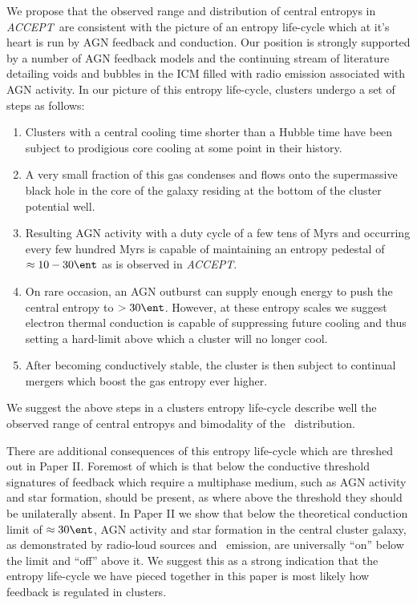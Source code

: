 \documentclass[12pt, preprint]{aastex}
\newcommand{\accept}{\textit{ACCEPT}}
\begin{document}
{{We propose that the observed range and distribution of central
entropys in \accept\ are consistent with the picture of an entropy
life-cycle which at it's heart is run by AGN feedback and
conduction. Our position is strongly supported by a number of AGN
feedback models and the continuing stream of literature detailing
voids and bubbles in the ICM filled with radio emission associated
with AGN activity. In our picture of this entropy life-cycle, clusters
undergo a set of steps as follows:
\begin{enumerate}
\item Clusters with a central cooling time shorter than a Hubble time
have been subject to prodigious core cooling at some point in their
history.
\item A very small fraction of this gas condenses and flows onto the
supermassive black hole in the core of the galaxy residing at the
bottom of the cluster potential well.
\item Resulting AGN activity with a duty cycle of a few tens of Myrs
and occurring every few hundred Myrs is capable of maintaining an entropy
pedestal of $\approx 10-30 \ent$ as is observed in \accept.
\item On rare occasion, an AGN outburst can supply enough energy to
push the central entropy to $> 30 \ent$. However, at these entropy
scales we suggest electron thermal conduction is capable of
suppressing future cooling and thus setting a hard-limit above which a
cluster will no longer cool.
\item After becoming conductively stable, the cluster is then subject
to continual mergers which boost the gas entropy ever higher.
\end{enumerate}
We suggest the above steps in a clusters entropy life-cycle describe
well the observed range of central entropys and bimodality of the
\kna\ distribution.

There are additional consequences of this entropy life-cycle which are
threshed out in Paper II. Foremost of which is that below the
conductive threshold signatures of feedback which require a multiphase
medium, such as AGN activity and star formation, should be present, as
where above the threshold they should be unilaterally absent. In Paper
II we show that below the theoretical conduction limit of $\approx 30
\ent$, AGN activity and star formation in the central cluster galaxy, as
demonstrated by radio-loud sources and \halpha\ emission, are
universally ``on'' below the limit and ``off'' above it. We suggest
this as a strong indication that the entropy life-cycle we have
pieced together in this paper is most likely how feedback is regulated
in clusters.

}}
\end{document}
